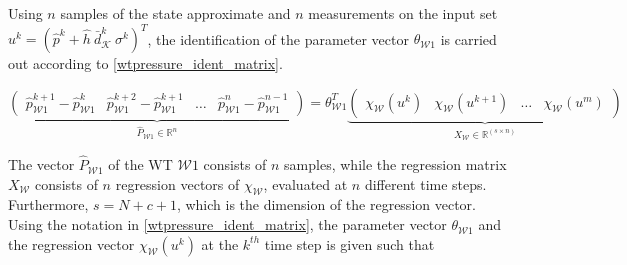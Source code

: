 Using $n$ samples of the state approximate and $n$ measurements on the input set $u^k = ( \hat{p}^{k}\! + \!\hat{h} \ \bar{d}^{k}_{\mathcal{K}} \ \sigma^{k} )^T$, the identification of the parameter vector $\theta_{\mathcal{W}1}$ is carried out according to \eqref{wtpressure_ident_matrix}. 

  \begin{equation}
\label{wtpressure_ident_matrix}
\underbrace{\begin{pmatrix}
           \! \hat{p}^{k+1}_{ \mathcal{W}1} - \hat{p}^{k}_{\mathcal{W}1} & \hat{p}^{k+2}_{ \mathcal{W}1} - \hat{p}^{k+1}_{\mathcal{W}1} & \hdots  & \hat{p}^{n}_{ \mathcal{W}1} - \hat{p}^{n-1}_{\mathcal{W}1}
         \end{pmatrix}}_{\hat{P}_{\mathcal{W}1}  \in  \mathbb{R}^{n}} 
         = \theta^T_{\mathcal{W}1}    
         \underbrace{\begin{pmatrix}
            \chi_{\mathcal{W}}(u^{k}) & \chi_{\mathcal{W}}(u^{k+1}) & \hdots & \chi_{\mathcal{W}}(u^{m})
         \end{pmatrix}}_{X_{\mathcal{W}} \in \mathbb{R}^{(s \times n)}}
\end{equation}

The vector $\hat{P}_{\mathcal{W}1}$ of the WT $\mathcal{W}1$ consists of $n$ samples, while the regression matrix $X_{\mathcal{W}}$ consists of $n$ regression vectors of $\chi_{\mathcal{W}}$, evaluated at $n$ different time steps. Furthermore, $s = N \!+\! c \! + \!1$, which is the dimension of the regression vector. Using the notation in \eqref{wtpressure_ident_matrix}, the parameter vector $\theta_{\mathcal{W}1}$ and the regression vector $\chi_{\mathcal{W}}(u^k)$ at the $k^{th}$ time step is given such that

